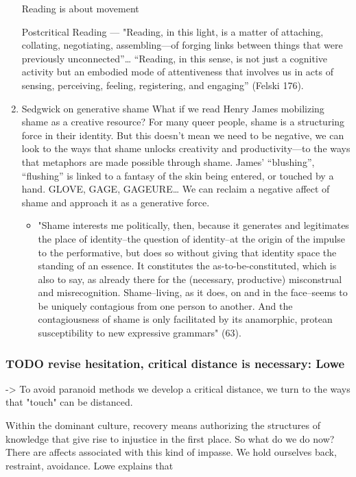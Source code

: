\documentclass[11pt]{article}
\begin{document}
\begin{enumerate}
Reading is about movement 


Postcritical Reading --- "Reading, in this light, is a matter of
attaching, collating, negotiating, assembling—of forging links between
things that were previously unconnected”… “Reading, in this sense, is
not just a cognitive activity but an embodied mode of attentiveness
that involves us in acts of sensing, perceiving, feeling, registering,
and engaging” (Felski 176).

\item Sedgwick on generative shame
\label{sec:org95bdebe}
What if we read Henry James mobilizing shame as a creative resource?
  For many queer people, shame is a structuring force in their
  identity. But this doesn’t mean we need to be negative, we can look
  to the ways that shame unlocks creativity and productivity---to the
  ways that metaphors are made possible through shame. James’
  “blushing”, “flushing” is linked to a fantasy of the skin being
  entered, or touched by a hand. GLOVE, GAGE, GAGEURE…  We can reclaim
  a negative affect of shame and approach it as a generative force.
\begin{itemize}
\item "Shame interests me politically, then, because it generates and
legitimates the place of identity--the question of identity--at the
origin of the impulse to the performative, but does so without
giving that identity space the standing of an essence. It
constitutes the as-to-be-constituted, which is also to say, as
already there for the (necessary, productive) misconstrual and
misrecognition. Shame--living, as it does, on and in the face--seems
to be uniquely contagious from one person to another. And the
contagiousness of shame is only facilitated by its anamorphic,
protean susceptibility to new expressive grammars" (63).
\end{itemize}
\end{enumerate}

\subsubsection{{\bfseries\sffamily TODO} revise hesitation, critical distance is necessary: Lowe}
\label{sec:orgd1137a7}
-> To avoid paranoid methods we develop a critical distance, we turn to
the ways that "touch" can be distanced. 

Within the dominant culture, recovery means authorizing the structures
of knowledge that give rise to injustice in the first place. So what
do we do now? There are affects associated with this kind of
impasse. We hold ourselves back, restraint, avoidance. Lowe explains
that
\end{document}
